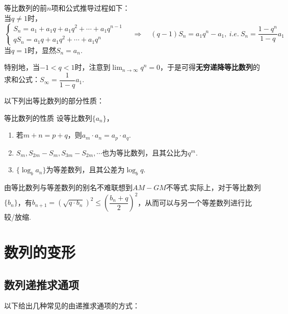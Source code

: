 \documentclass[lang=cn, zihao=5]{elegantbook}
\newcommand{\ssb}[1]{\left( #1 \right)}
\begin{document}
等比数列的前$n$项和公式推导过程如下： \\
当$q \neq 1$时，
$$\begin{cases}
	S_n = a_1 + a_1q + a_1q^2 + \cdots + a_1q^{n-1} \\
	qS_n = a_1q + a_1q^2 + \cdots + a_1q^{n} 
\end{cases}
\quad \Longrightarrow \quad
(q-1)S_n = a_1q^{n} - a_1,~i.e.~S_n = \frac{1-q^n}{1-q} a_1
$$
当$q = 1$时，显然$S_n = a_n$.

特别地，当$-1<q<1$时，注意到$\lim _{n \to \infty} q^n=0$，于是可得\textbf{无穷递降等比数列}的求和公式：$S_{\infty} = \dfrac{1}{1-q}a_1$.

以下列出等比数列的部分性质：

\begin{proposition}{等比数列的性质}
	设等比数列$\{ a_n \}$，
	\begin{enumerate}
		\item 若$m+n=p+q$，则$a_m \cdot a_n = a_p \cdot a_q$.
		\item $S_m,S_{2m}-S_m,S_{3m}-S_{2m},\cdots $也为等比数列，且其公比为$q^{m}$.
		\item $\{ \log _{b}{a_n} \}$为等差数列，且其公差为$\log _{b}{q}$.
	\end{enumerate}
\end{proposition}

由等比数列与等差数列的别名不难联想到$AM-GM$不等式.实际上，对于等比数列$\{ b_n \}$，有$b_{n+1} = (\sqrt{q \cdot b_n})^2 \leq \ssb{\dfrac{b_n+q}{2}}^2$，从而可以与另一个等差数列进行比较/放缩.

\section{数列的变形}

\subsection{数列递推求通项}

以下给出几种常见的由递推求通项的方式：
\end{document}
